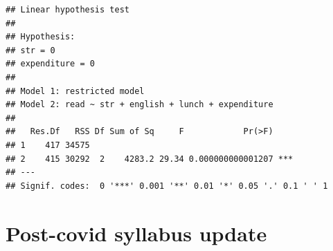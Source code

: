 \documentclass[
]{book}
\begin{document}
\begin{verbatim}
## Linear hypothesis test
## 
## Hypothesis:
## str = 0
## expenditure = 0
## 
## Model 1: restricted model
## Model 2: read ~ str + english + lunch + expenditure
## 
##   Res.Df   RSS Df Sum of Sq     F            Pr(>F)    
## 1    417 34575                                         
## 2    415 30292  2    4283.2 29.34 0.000000000001207 ***
## ---
## Signif. codes:  0 '***' 0.001 '**' 0.01 '*' 0.05 '.' 0.1 ' ' 1
\end{verbatim}

\hypertarget{post-covid-syllabus-update}{%
\chapter{Post-covid syllabus update}\label{post-covid-syllabus-update}}
\end{document}
